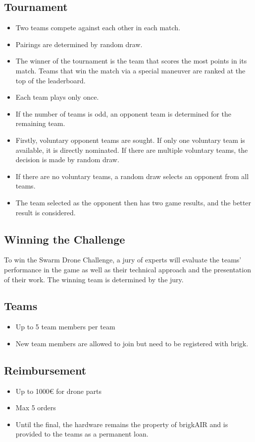 \subsection{Tournament}

\begin{itemize}
	\item Two teams compete against each other in each match.
	\item Pairings are determined by random draw.
	\item The winner of the tournament is the team that scores the most points in its match. Teams that win the match via a special maneuver are ranked at the top of the leaderboard.
	\item Each team plays only once.
	\item If the number of teams is odd, an opponent team is determined for the remaining team.
	\item Firstly, voluntary opponent teams are sought. If only one voluntary team is available, it is directly nominated. If there are multiple voluntary teams, the decision is made by random draw.
	\item If there are no voluntary teams, a random draw selects an opponent from all teams.
	\item The team selected as the opponent then has two game results, and the better result is considered.
\end{itemize}


\subsection{Winning the Challenge}
To win the Swarm Drone Challenge, a jury of experts will evaluate the teams' performance in the game as well as their technical approach and the presentation of their work. The winning team is determined by the jury.

\subsection{Teams}
\begin{itemize}
	\item{Up to 5 team members per team}
	\item{New team members are allowed to join but need to be registered with brigk.}
\end{itemize}

\subsection{Reimbursement}
\begin{itemize}
	\item Up to 1000€ for drone parts
	\item Max 5 orders
	\item Until the final, the hardware remains the property of brigkAIR and is provided to the teams as a permanent loan.

\end{itemize}

